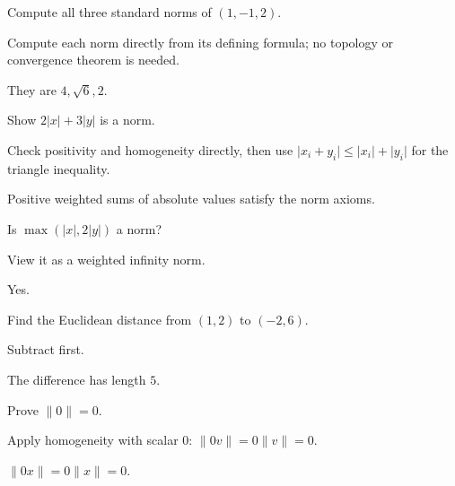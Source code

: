\begin{exercise}\label{exr:ii02-01}
Compute all three standard norms of $(1,-1,2)$.
\end{exercise}
\begin{hint}
Compute each norm directly from its defining formula; no topology or convergence theorem is needed.
\end{hint}
\begin{solution}
They are $4,\sqrt6,2$.
\end{solution}

\begin{exercise}\label{exr:ii02-02}
Show $2|x|+3|y|$ is a norm.
\end{exercise}
\begin{hint}
Check positivity and homogeneity directly, then use \(\lvert x_i+y_i\rvert\le \lvert x_i\rvert+\lvert y_i\rvert\) for the triangle inequality.
\end{hint}
\begin{solution}
Positive weighted sums of absolute values satisfy the norm axioms.
\end{solution}

\begin{exercise}\label{exr:ii02-03}
Is $\max(|x|,2|y|)$ a norm?
\end{exercise}
\begin{hint}
View it as a weighted infinity norm.
\end{hint}
\begin{solution}
Yes.
\end{solution}

\begin{exercise}\label{exr:ii02-04}
Find the Euclidean distance from $(1,2)$ to $(-2,6)$.
\end{exercise}
\begin{hint}
Subtract first.
\end{hint}
\begin{solution}
The difference has length $5$.
\end{solution}

\begin{exercise}\label{exr:ii02-05}
Prove $\|0\|=0$.
\end{exercise}
\begin{hint}
Apply homogeneity with scalar \(0\): \(\lVert 0v\rVert=0\lVert v\rVert=0\).
\end{hint}
\begin{solution}
$\|0x\|=0\|x\|=0$.
\end{solution}

